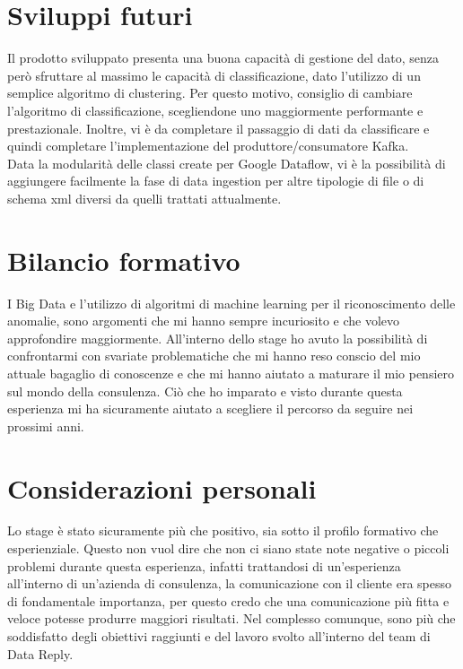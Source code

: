 \section{Sviluppi futuri}
Il prodotto sviluppato presenta una buona capacità di gestione del dato, senza però sfruttare al massimo le capacità di classificazione, dato l'utilizzo di un semplice algoritmo di clustering. Per questo motivo, consiglio di cambiare l'algoritmo di classificazione, scegliendone uno maggiormente performante e prestazionale. Inoltre, vi è da completare il passaggio di dati da classificare e quindi completare l'implementazione del produttore/consumatore Kafka.
\\
Data la modularità delle classi create per Google Dataflow, vi è la possibilità di aggiungere facilmente la fase di data ingestion per altre tipologie di file o di schema xml diversi da quelli trattati attualmente.
\section{Bilancio formativo}
I Big Data e l'utilizzo di algoritmi di machine learning per il riconoscimento delle anomalie, sono argomenti che mi hanno sempre incuriosito e che volevo approfondire maggiormente. All'interno dello stage ho avuto la possibilità di confrontarmi con svariate problematiche che mi hanno reso conscio del mio attuale bagaglio di conoscenze e che mi hanno aiutato a maturare il mio pensiero sul mondo della consulenza.
Ciò che ho imparato e visto durante questa esperienza mi ha sicuramente aiutato a scegliere il percorso da seguire nei prossimi anni.
\section{Considerazioni personali}
Lo stage è stato sicuramente più che positivo, sia sotto il profilo formativo che esperienziale. Questo non vuol dire che non ci siano state note negative o piccoli problemi durante questa esperienza, infatti trattandosi di un'esperienza all'interno di un'azienda di consulenza, la comunicazione con il cliente era spesso di fondamentale importanza, per questo credo che una comunicazione più fitta e veloce potesse produrre maggiori risultati. 
Nel complesso comunque, sono più che soddisfatto degli obiettivi raggiunti e del lavoro svolto all'interno del team di Data Reply.